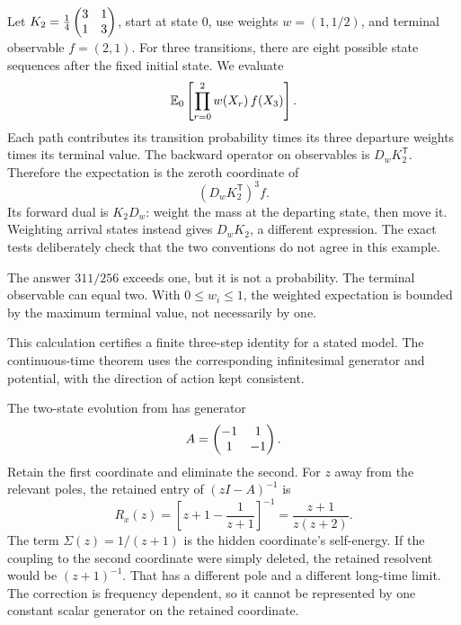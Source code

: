 Let $K_2=\frac14\begin{pmatrix}3&1\\1&3\end{pmatrix}$, start at state $0$, use weights $w=(1,1/2)$, and terminal observable $f=(2,1)$. For three transitions, there are eight possible state sequences after the fixed initial state. We evaluate
\[
\EE_0\left[\prod_{r=0}^{2}w(X_r)\,f(X_3)\right].
\]
Each path contributes its transition probability times its three departure weights times its terminal value.
The backward operator on observables is $D_w K_2^{\mathsf T}$. Therefore the expectation is the zeroth coordinate of
\[
(D_wK_2^{\mathsf T})^3f.
\]
Its forward dual is $K_2D_w$: weight the mass at the departing state, then move it. Weighting arrival states instead gives $D_wK_2$, a different expression. The exact tests deliberately check that the two conventions do not agree in this example.

The answer $311/256$ exceeds one, but it is not a probability. The terminal observable can equal two. With $0\le w_i\le1$, the weighted expectation is bounded by the maximum terminal value, not necessarily by one.

This calculation certifies a finite three-step identity for a stated model. The continuous-time theorem uses the corresponding infinitesimal generator and potential, with the direction of action kept consistent.

The two-state evolution from  has generator
\[
A=\begin{pmatrix}-1&1\\1&-1\end{pmatrix}.
\]
Retain the first coordinate and eliminate the second. For $z$ away from the relevant poles, the retained entry of $(zI-A)^{-1}$ is
\[
R_x(z)=\left[z+1-\frac1{z+1}\right]^{-1}
=\frac{z+1}{z(z+2)}.
\]
The term $\Sigma(z)=1/(z+1)$ is the hidden coordinate's self-energy.
If the coupling to the second coordinate were simply deleted, the retained resolvent would be $(z+1)^{-1}$. That has a different pole and a different long-time limit. The correction is frequency dependent, so it cannot be represented by one constant scalar generator on the retained coordinate.

